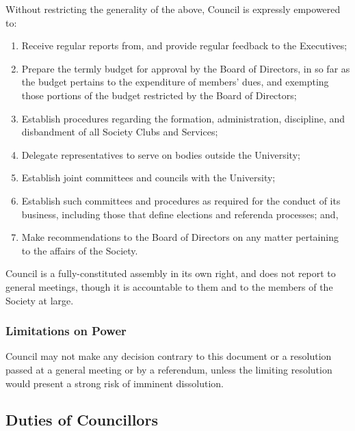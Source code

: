 Without restricting the generality of the above, Council is expressly
empowered to:
\begin{enumerate}
    \item Receive regular reports from, and provide regular feedback to the
        Executives;
    \item Prepare the termly budget for approval by the Board of Directors, in
        so far as the budget pertains to the expenditure of members’ dues, and
        exempting those portions of the budget restricted by the Board of 
        Directors;
    \item Establish procedures regarding the formation, administration,
        discipline, and disbandment of all Society Clubs and Services;
    \item Delegate representatives to serve on bodies outside the University;
    \item Establish joint committees and councils with the University;
    \item Establish such committees and procedures as required for the conduct
        of its business, including those that define elections and referenda
        processes; and,
    \item Make recommendations to the Board of Directors on any matter
        pertaining to the affairs of the Society.
\end{enumerate}

Council is a fully-constituted assembly in its own right,
and does not report to general meetings, though it is accountable to them and
to the members of the Society at large.

\subsubsection{Limitations on Power}
Council may not make any decision contrary to this document or a
resolution passed at a general meeting or by a referendum, unless the limiting
resolution would present a strong risk of imminent dissolution.

\subsection{Duties of Councillors}

